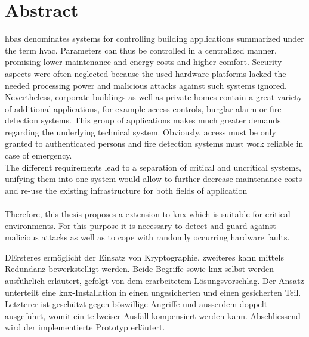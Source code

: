 \chapter*{Abstract}
\gls{hbas} denominates systems for controlling building applications summarized under the term \gls{hvac}. Parameters can thus be controlled in a centralized manner, 
promising lower maintenance and energy costs and higher comfort. Security aspects were often neglected because the used hardware platforms lacked the needed processing power
and malicious attacks against such systems ignored.
\\
Nevertheless, corporate buildings as well as private homes contain a great variety of additional applications, for example access controls, burglar alarm or fire detection systems.
This group of applications makes much greater demands regarding the underlying technical system. Obviously, access must be only granted to authenticated persons and fire detection
systems must work reliable in case of emergency. 
\\
The different requirements lead to a separation of critical and uncritical systems, unifying them into one system would allow to further decrease maintenance costs and re-use
the existing infrastructure for both fields of application 
\\
\\
Therefore, this thesis proposes a extension to \gls{knx} which is suitable for critical environments. For this purpose it is necessary to detect and guard against malicious attacks
as well as to cope with randomly occurring hardware faults. 


DErsteres ermöglicht der Einsatz von Kryptographie,
zweiteres kann mittels Redundanz bewerkstelligt werden. Beide Begriffe sowie \gls{knx} selbst werden ausführlich erläutert, gefolgt von dem erarbeitetem Lösungsvorschlag.
Der Ansatz unterteilt eine \gls{knx}-Installation in einen ungesicherten und einen gesicherten Teil. Letzterer ist geschützt gegen böswillige Angriffe und ausserdem doppelt ausgeführt,
womit ein teilweiser Ausfall kompensiert werden kann. Abschliessend wird der implementierte Prototyp erläutert. 